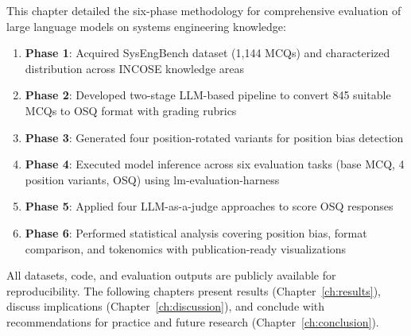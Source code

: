 This chapter detailed the six-phase methodology for comprehensive evaluation of large language models on systems engineering knowledge:

\begin{enumerate}
    \item \textbf{Phase 1}: Acquired SysEngBench dataset (1,144 MCQs) and characterized distribution across INCOSE knowledge areas
    \item \textbf{Phase 2}: Developed two-stage LLM-based pipeline to convert 845 suitable MCQs to OSQ format with grading rubrics
    \item \textbf{Phase 3}: Generated four position-rotated variants for position bias detection
    \item \textbf{Phase 4}: Executed model inference across six evaluation tasks (base MCQ, 4 position variants, OSQ) using lm-evaluation-harness
    \item \textbf{Phase 5}: Applied four LLM-as-a-judge approaches to score OSQ responses
    \item \textbf{Phase 6}: Performed statistical analysis covering position bias, format comparison, and tokenomics with publication-ready visualizations
\end{enumerate}

All datasets, code, and evaluation outputs are publicly available for reproducibility. The following chapters present results (Chapter~\ref{ch:results}), discuss implications (Chapter~\ref{ch:discussion}), and conclude with recommendations for practice and future research (Chapter~\ref{ch:conclusion}).


